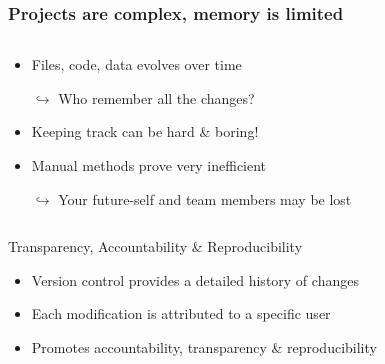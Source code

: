 \documentclass[xcolor=x11names,compress]{beamer}
\renewcommand{\(}{\begin{columns}}
\renewcommand{\)}{\end{columns}}
\newcommand{\<}[1]{\begin{column}{#1}}
\renewcommand{\>}{\end{column}}
\begin{document}
\begin{frame}
\frametitle{Projects are complex, memory is limited}
\begin{columns}[t]
 \begin{column}{0.6\textwidth}
 \begin{itemize}[<+->]
        \item Files, code, data evolves over time
        \item[$\hookrightarrow$] Who remember all the changes?
        \item Keeping track can be hard \& boring!
        \item Manual methods prove very inefficient
        \item[$\hookrightarrow$] Your future-self and team members may be lost

    \end{itemize}
 \end{column}
  \begin{column}{0.4\textwidth}
    \begin{center}
    \begin{itemize}

    \end{itemize}
    \end{center}
  \end{column}
\end{columns}
\end{frame}

\begin{frame}{Transparency, Accountability \& Reproducibility}
    \begin{itemize}[<+->]
        \item Version control provides a detailed history of changes
        \item Each modification is attributed to a specific user
        \item Promotes accountability, transparency \&  reproducibility
    \end{itemize}
\end{frame}
\end{document}
